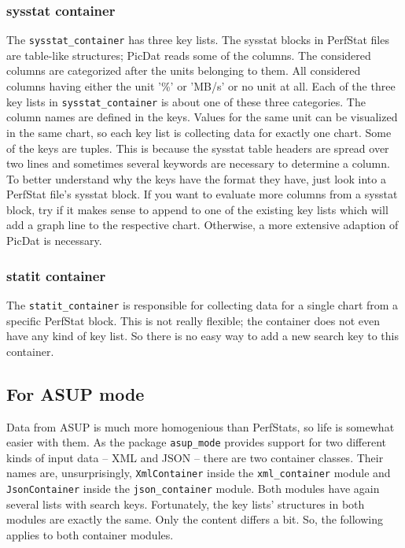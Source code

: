 \documentclass[a4paper,11pt]{article}
\begin{document}
\subsubsection*{sysstat container}
The \verb|sysstat_container| has three key lists. The sysstat blocks in PerfStat files are table-like structures; PicDat reads some of the columns. The considered columns are categorized after the units belonging to them. All considered columns having either the unit '\%' or 'MB/s' or no unit at all. Each of the three key lists in \verb|sysstat_container| is about one of these three categories. The column names are defined in the keys. Values for the same unit can be visualized in the same chart, so each key list is collecting data for exactly one chart. Some of the keys are tuples. This is because the sysstat table headers are spread over two lines and sometimes several keywords are necessary to determine a column. To better understand why the keys have the format they have, just look into a PerfStat file's sysstat block. If you want to evaluate more columns from a sysstat block, try if it makes sense to append to one of the existing key lists which will add a graph line to the respective chart. Otherwise, a more extensive adaption of PicDat is necessary.

\subsubsection*{statit container}
The \verb|statit_container| is responsible for collecting data for a single chart from a specific PerfStat block. This is not really flexible; the container does not even have any kind of key list. So there is no easy way to add a new search key to this container.

\subsection*{For ASUP mode}
Data from ASUP is much more homogenious than PerfStats, so life is somewhat easier with them. As the package \verb|asup_mode| provides support for two different kinds of input data -- XML and JSON -- there are two container classes. Their names are, unsurprisingly, \verb|XmlContainer| inside the \verb|xml_container| module and \verb|JsonContainer| inside the \verb|json_container| module. Both modules have again several lists with search keys. Fortunately, the key lists' structures in both modules are exactly the same. Only the content differs a bit. So, the following applies to both container modules.
\end{document}
